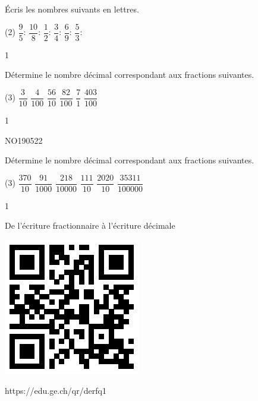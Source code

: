 \documentclass[a4paper,11pt]{report}
\begin{document}
\begin{exop}{
Écris les nombres suivants en lettres.
\begin{tasks}(2)
    \task $\dfrac{9}{5}$: \hrulefill
    \task $\dfrac{10}{8}$: \hrulefill
    \task $\dfrac{1}{2}$: \hrulefill
    \task $\dfrac{3}{4}$: \hrulefill
    \task $\dfrac{6}{9}$: \hrulefill
    \task $\dfrac{5}{3}$: \hrulefill
\end{tasks}
 \vspace{1pt}

}{1}\end{exop}

\vfill

\begin{exo}{
	Détermine le nombre décimal correspondant aux fractions suivantes.
	\begin{tasks}(3)
		\task $\dfrac{3}{10}$
		\task $\dfrac{4}{100}$
		\task $\dfrac{56}{10}$
		\task $\dfrac{82}{100}$
		\task $\dfrac{7}{1}$
		\task $\dfrac{403}{100}$
	\end{tasks}
 \vspace{1pt}
}{1}\end{exo}


\vfill


\begin{exol}{NO190}{52}{2}
\end{exol}


\vfill

\begin{exo}{
	Détermine le nombre décimal correspondant aux fractions suivantes.
	\begin{tasks}(3)
		\task $\dfrac{370}{10}$
		\task $\dfrac{91}{1000}$
		\task $\dfrac{218}{10000}$
		\task $\dfrac{111}{10}$
		\task $\dfrac{2020}{10}$
		\task $\dfrac{35311}{100000}$
	\end{tasks}
 \vspace{1pt}
}{1}\end{exo}


\vfill

\begin{qmun}{De l'écriture fractionnaire à l'écriture décimale}{
		\begin{center}
\includegraphics[scale=1]{media/qr/derfq1}

\tiny{{https://edu.ge.ch/qr/derfq1}}
		\end{center}
	}
\end{qmun}
\end{document}
